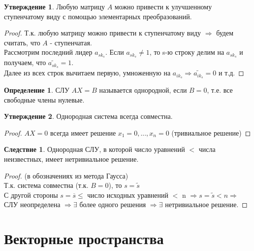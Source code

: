 \documentclass[a4paper, 12pt]{article}
\theoremstyle{definition}
\newtheorem*{definition}{Определение}
\newtheorem*{consequense}{Следствие}
\newtheorem*{subtheorem}{Утверждение}
\begin{document}
  \begin{subtheorem}
    Любую матрицу $A$  можно привести к улучшенному ступенчатому виду с помощью элементарных преобразований.
  \end{subtheorem} 
  \begin{proof}
    Т.к. любую матрицу можно привести к ступенчатому виду $\Longrightarrow$ будем считать, что $A$ - ступенчатая. \\
    Рассмотрим последний лидер $a_{sk_s}$. Если $a_{sk_s} \neq 1$, то s-ю строку делим на $a_{sk_s}$ и получаем, что $\widetilde{a_{sk_s}}=1$. \\ Далее из всех строк вычитаем первую, умноженную на $a_{ik_s} \Longrightarrow \widetilde{a_{ik_s}}  =0$ и т.д. 
  \end{proof} 

  \begin{definition}
    СЛУ $AX=B$ называется однородной, если $B=0$, т.е. все свободные члены нулевые.  
  \end{definition} 
  \begin{subtheorem}
    Однородная система всегда совместна.
  \end{subtheorem} 
  \begin{proof}
    $AX=0$ всегда имеет решение $x_1=0,...,x_n=0$ (тривиальное решение)
  \end{proof} 
  \begin{consequense}
    Однородная СЛУ, в которой число уравнений $<$ числа неизвестных, имеет нетривиальное решение.  
  \end{consequense} 
  \begin{proof}
    (в обозначениях из метода Гаусса)\\
    Т.к. система совместна (т.к. $B=0$), то $s=\widetilde{s}$ \\
    С другой стороны $s=\overline{s} \leq$ число исходных уравнений $<$ n $\Longrightarrow s=\widetilde{s} < n \Longrightarrow$ СЛУ неопределена $\Longrightarrow \exists$ более одного решения $\Longrightarrow \exists$ нетривиальное решение.     
  \end{proof} 

  \newpage
  \section{Векторные пространства}
\end{document}
